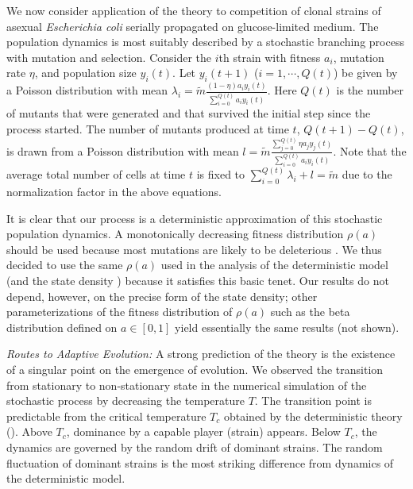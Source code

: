 \documentclass[amsmath,amssymb,floatf
ix]{revtex4}
\begin{document}
We now consider application of the theory to competition of clonal strains of asexual
\textit{Escherichia coli} serially propagated on glucose-limited medium. The population dynamics is most suitably described by a stochastic branching process with
mutation and selection. Consider the $i$th strain with
fitness $a_i$, mutation rate $\eta$, and population size
$y_i(t)$.
Let $y_i(t+1)$ ($i = 1, \cdots, Q(t)$) be given by
a Poisson distribution with mean
$  \lambda_i = \tilde{m} \frac { (1-\eta) a_i y_i(t) }{\sum_{i=0}^{Q(t)}
{ a_i y_i(t)} }.$
Here $Q(t)$ is the number of mutants that were
generated and that survived the initial step since the process
started.
The number of mutants produced at time $t$, $Q(t+1)-Q(t)$, is drawn from a
Poisson distribution with mean
$ l = \tilde{m} \frac { \sum_{j=0}^{Q(t)} {\eta a_j y_j(t)} } {
\sum_{i=0}^{Q(t)} { a_i y_i(t)} }$.
Note that the average total number of cells at time $t$ is fixed to
$\sum_{i=0}^{Q(t)} \lambda_i + l = \tilde{m}$ due to the normalization
factor in the above equations.

It is clear that our process  is a deterministic approximation
of this stochastic population dynamics. A monotonically decreasing
fitness distribution $\rho(a)$ should be used because most mutations
are likely to be deleterious \cite{Fisher58}.  We thus decided to use
the same $\rho(a)$ used in the analysis of the deterministic model (and
the state density ) because it satisfies this basic tenet.  Our
results do not depend, however, on the precise form of the state
density; other parameterizations of the fitness distribution of
$\rho(a)$ such as the beta distribution defined on $ a \in [0,1]$
yield essentially the same results (not shown).

\textit{Routes to Adaptive Evolution:}
A strong prediction of the theory is the existence of a singular point
on the emergence of evolution. We observed the transition from
stationary to non-stationary state in the numerical simulation of the
stochastic process by decreasing the temperature $T$. The
transition point is predictable from the critical temperature $T_c$
obtained by the deterministic theory (). Above $T_c$, dominance
by a capable player (strain) appears. Below $T_c$, the dynamics are
governed by the random drift of dominant strains. The random fluctuation of dominant
strains is the most striking difference from dynamics of the deterministic model.
\end{document}
